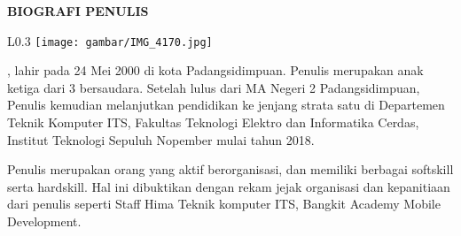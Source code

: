 \begin{center}
  \Large
  \textbf{BIOGRAFI PENULIS}
\end{center}


\vspace{2ex}

\begin{wrapfigure}{L}{0.3\textwidth}
  \centering
  \vspace{-3ex}
  \texttt{[image: gambar/IMG\_4170.jpg]}
  \vspace{-4ex}
\end{wrapfigure}

\name{}, lahir pada 24 Mei 2000 di kota Padangsidimpuan. Penulis merupakan anak ketiga dari 3 bersaudara.
Setelah lulus dari MA Negeri 2 Padangsidimpuan, Penulis kemudian melanjutkan pendidikan ke jenjang strata satu di Departemen Teknik Komputer ITS, Fakultas Teknologi Elektro dan Informatika Cerdas, Institut Teknologi Sepuluh Nopember mulai tahun 2018.

Penulis merupakan orang yang aktif berorganisasi, dan memiliki berbagai softskill serta hardskill. Hal ini dibuktikan dengan rekam jejak organisasi dan kepanitiaan dari penulis seperti Staff Hima Teknik komputer ITS, Bangkit Academy Mobile Development.
